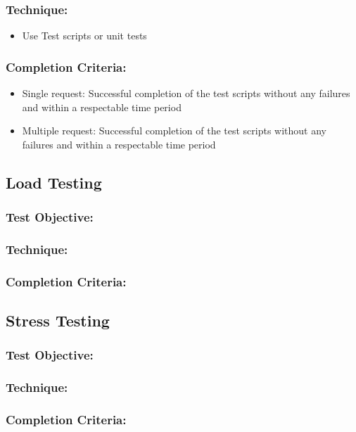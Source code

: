\documentclass[a4paper,12pt]{report}
\begin{document}
			\subsubsection {Technique:}
				\begin {itemize}
					\item Use Test scripts or unit tests 
				\end {itemize}
			\subsubsection {Completion Criteria:}
				\begin {itemize}
					\item Single request: Successful completion of the test scripts without any failures and within a respectable time period
					\item Multiple request: Successful completion of the test scripts without any failures and within a respectable time period
				\end {itemize}

\iffalse				
		\subsection {Load Testing}
			\subsubsection {Test Objective:}
			\subsubsection {Technique:}
			\subsubsection {Completion Criteria:}
			
		\subsection {Stress Testing}
			\subsubsection {Test Objective:}
			\subsubsection {Technique:}
			\subsubsection {Completion Criteria:}
			
\end{document}
